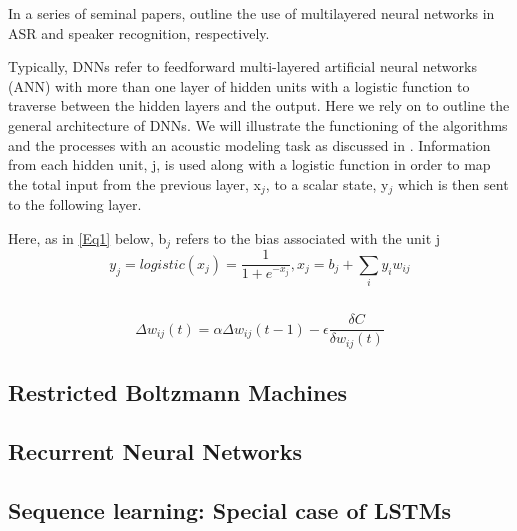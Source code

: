 \documentclass{article}[12pt]
\begin{document}
In a series of seminal papers, \cite{bengio1989_acm,bengio1989} outline the use of multilayered neural networks in ASR and speaker recognition, respectively.


Typically, DNNs refer to feedforward multi-layered artificial neural networks (ANN) with more than one layer of hidden units with a logistic function to traverse between the hidden layers and the output. Here we rely on \cite{hinton2012} to outline the general architecture of DNNs. We will illustrate the functioning of the algorithms and the processes with an acoustic modeling task as discussed in \cite{hinton2012}. Information from each hidden unit, j, is used along with a logistic function in order to map the total input from the previous layer, x$_j$, to a scalar state, y$_j$ which is then sent to the following layer.

Here, as in \ref{Eq1} below, b$_j$ refers to the bias associated with the unit j
\begin{equation}
y_{j}=logistic(x_{j})=\frac{1}{1+e^{-x_{j}}}, x_{j} = b_{j} + \sum_{i}y_{i}w_{ij}
\label{Eq1}
\end{equation}

\begin{equation}
\label{Eq2}
\end{equation}

\begin{equation}
\label{Eq3}
\end{equation}
\begin{equation}
\Delta w_{ij}(t)=\alpha\Delta w_{ij}(t-1) - \epsilon \frac{\delta C}{\delta w_{ij}(t)}
\label{Eq4}
\end{equation}

\subsection{Restricted Boltzmann Machines}

\subsection{Recurrent Neural Networks}

\subsection{Sequence learning: Special case of LSTMs}
\end{document}
